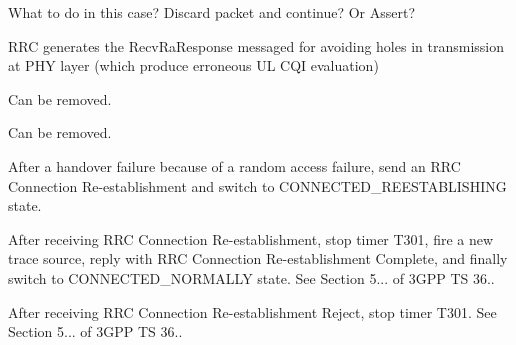 \begin{DoxyRefList}
What to do in this case? Discard packet and continue? Or Assert?  
\item[\label{todo__todo000097}%
\hypertarget{todo__todo000097}{}%
Member \hyperlink{classns3_1_1LteUeMac_a95cdea8ecb74801b20f9883af6f27d81}{ns3\+:\+:Lte\+Ue\+Mac\+:\+:Do\+Receive\+Lte\+Control\+Message} (Ptr$<$ Lte\+Control\+Message $>$ msg)]R\+RC generates the Recv\+Ra\+Response messaged for avoiding holes in transmission at P\+HY layer (which produce erroneous UL C\+QI evaluation)  
\item[\label{todo__todo000098}%
\hypertarget{todo__todo000098}{}%
Member \hyperlink{classns3_1_1LteUePhy_a7a570be9003110d7dfaecf414bc34543}{ns3\+:\+:Lte\+Ue\+Phy\+:\+:m\+\_\+subframe\+No} ]Can be removed.  
\item[\label{todo__todo000099}%
\hypertarget{todo__todo000099}{}%
Member \hyperlink{classns3_1_1LteUePhy_a075d805213fceb00b0298b183d68f157}{ns3\+:\+:Lte\+Ue\+Phy\+:\+:m\+\_\+ue\+Measurements\+Filter\+Last} ]Can be removed.  
\item[\label{todo__todo000100}%
\hypertarget{todo__todo000100}{}%
Member \hyperlink{classns3_1_1LteUeRrc_a1b8029d874c7eea580030d17a670b7fb}{ns3\+:\+:Lte\+Ue\+Rrc\+:\+:Do\+Notify\+Random\+Access\+Failed} ()]After a handover failure because of a random access failure, send an R\+RC Connection Re-\/establishment and switch to C\+O\+N\+N\+E\+C\+T\+E\+D\+\_\+\+R\+E\+E\+S\+T\+A\+B\+L\+I\+S\+H\+I\+NG state.  
\item[\label{todo__todo000101}%
\hypertarget{todo__todo000101}{}%
Member \hyperlink{classns3_1_1LteUeRrc_a413ac63152027ed925cedcf714ec8207}{ns3\+:\+:Lte\+Ue\+Rrc\+:\+:Do\+Recv\+Rrc\+Connection\+Reestablishment} (\hyperlink{structns3_1_1LteRrcSap_1_1RrcConnectionReestablishment}{Lte\+Rrc\+Sap\+::\+Rrc\+Connection\+Reestablishment} msg)]After receiving R\+RC Connection Re-\/establishment, stop timer T301, fire a new trace source, reply with R\+RC Connection Re-\/establishment Complete, and finally switch to C\+O\+N\+N\+E\+C\+T\+E\+D\+\_\+\+N\+O\+R\+M\+A\+L\+LY state. See Section 5... of 3\+G\+PP TS 36..  
\item[\label{todo__todo000102}%
\hypertarget{todo__todo000102}{}%
Member \hyperlink{classns3_1_1LteUeRrc_a3428349639bbd4887aa543fcbd5152a4}{ns3\+:\+:Lte\+Ue\+Rrc\+:\+:Do\+Recv\+Rrc\+Connection\+Reestablishment\+Reject} (\hyperlink{structns3_1_1LteRrcSap_1_1RrcConnectionReestablishmentReject}{Lte\+Rrc\+Sap\+::\+Rrc\+Connection\+Reestablishment\+Reject} msg)]After receiving R\+RC Connection Re-\/establishment Reject, stop timer T301. See Section 5... of 3\+G\+PP TS 36..  

\end{DoxyRefList}
